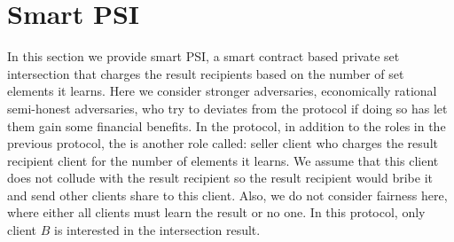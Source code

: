 
\section{Smart PSI}


In this section we provide smart PSI, a smart contract based private set intersection that charges the result recipients based on the number of set elements it learns. Here we consider stronger adversaries, economically rational semi-honest adversaries, who try to deviates from the protocol if doing so has let them gain some financial benefits. In the protocol, in addition to the roles in the previous protocol,   the is another role called: seller client who charges the result recipient client for the number of elements it learns. We assume that this client does not collude with the result recipient so the result recipient would bribe it and send other clients share to this client. Also, we do not consider fairness here, where either all clients must learn the result or no one. In this protocol, only client $B$ is interested in the intersection result. 

